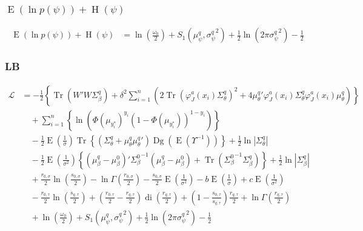 \documentclass[11pt]{article}
\DeclareMathOperator{\Tr}{Tr}
\newcommand{\opn}{\operatorname}
\begin{document}
\subsubsection{$\opn{E}\left(\ln p\left(\psi\right)\right) + \opn{H}\left(\psi\right)$}
\begin{align*}
  \opn{E}\left(\ln p\left(\psi\right)\right) + \opn{H}\left(\psi\right) &= \ln \left(\frac{\omega_{0}}{2}\right) + S_{1}\left(\mu_{\psi}^{q}, {\sigma_{\psi}^{q}}^{2}\right) + \frac{1}{2}\ln \left(2\pi {\sigma_{\psi}^{q}}^{2}\right) -\frac{1}{2}
\end{align*}
\subsubsection{LB}
  \begin{align*}
    \mathcal{L} &= -\frac{1}{2}\left\{\Tr\left(W'W\Sigma_{\beta}^{q}\right) + \delta^{2}\sum_{i=1}^{n}\left(2\Tr\left(\varphi_{J}^{a}\left(x_{i}\right)\Sigma_{\theta}^{q}\right)^{2} +4{\mu_{\theta}^{q}}'\varphi_{J}^{a}\left(x_{i}\right)\Sigma_{\theta}^{q}\varphi_{J}^{a}\left(x_{i}\right)\mu_{\theta}^{q}\right) \right\}\\
    &\quad + \sum_{i=1}^{n}\left\{\ln\left(\Phi\left(\mu_{y_{i}^{*}}\right)^{y_{i}}\left(1-\Phi\left(\mu_{y_{i}^{*}}\right)\right)^{1-y_{i}}\right) \right\}\\
    &\quad -\frac{1}{2}\opn{E}\left(\frac{1}{\sigma}\right)\Tr\left\{\left(\Sigma_{\theta}^{q}+\mu_{\theta}^{q}{\mu_{\theta}^{q}}'\right)\opn{Dg}\left(\opn{E}\left(\Upsilon^{-1}\right)\right) \right\} +\frac{1}{2}\ln\left|\Sigma_{\theta}^{q}\right|\\
    &\quad -\frac{1}{2}\opn{E}\left(\frac{1}{\sigma^{2}}\right)\left\{\left(\mu_{\beta}^{q}-\mu_{\beta}^{0}\right)'{\Sigma_{\beta}^{0}}^{-1}\left(\mu_{\beta}^{q}-\mu_{\beta}^{0}\right) + \Tr\left({\Sigma_{\beta}^{0}}^{-1}\Sigma_{\beta}^{q}\right) \right\} + \frac{1}{2}\ln\left|\Sigma_{\beta}^{q}\right|\\
    &\quad +\frac{r_{0,\sigma}}{2}\ln\left(\frac{s_{0,\sigma}}{2}\right)-\ln\Gamma\left(\frac{r_{0,\sigma}}{2}\right) -\frac{s_{0,\sigma}}{2}\opn{E}\left(\frac{1}{\sigma^{2}}\right) -b\opn{E}\left(\frac{1}{\sigma}\right) +c\opn{E}\left(\frac{1}{\sigma^{2}}\right)\\
    &\quad -\frac{r_{0,\tau}}{2}\ln\left(\frac{s_{q,\tau}}{2}\right) +\left(\frac{r_{0,\tau}}{2} -\frac{r_{q,\tau}}{2}\right)\opn{di}\left(\frac{r_{q,\tau}}{2}\right) +\left(1-\frac{s_{0,\tau}}{s_{q,\tau}}\right)\frac{r_{q,\tau}}{2} +\ln\Gamma\left(\frac{r_{q,\tau}}{2}\right)\\
    &\quad +\ln\left(\frac{\omega_{0}}{2}\right) + S_{1}\left(\mu_{\psi}^{q}, {\sigma_{\psi}^{q}}^{2}\right) + \frac{1}{2}\ln\left(2\pi {\sigma_{\psi}^{q}}^{2}\right) -\frac{1}{2}
  \end{align*}
\end{document}
